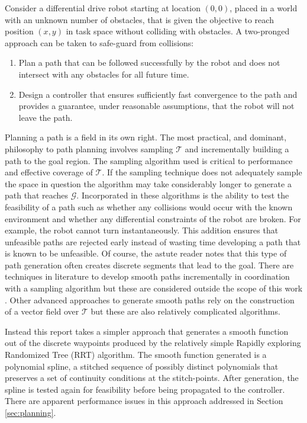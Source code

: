 \documentclass[oneside, 11pt]{book}
\begin{document}
Consider a differential drive robot starting at location $(0,0)$, placed in a world with an unknown number of obstacles, that is given the objective to reach position $(x,y)$ in task space without colliding with obstacles. A two-pronged approach can be taken to safe-guard from collisions:
\begin{enumerate}
    \item Plan a path that can be followed successfully by the robot and does not intersect with any obstacles for all future time.
    \item Design a controller that ensures sufficiently fast convergence to the path and provides a guarantee, under reasonable assumptions, that the robot will not leave the path.
\end{enumerate}

Planning a path is a field in its own right. The most practical, and dominant, philosophy to path planning involves sampling $\mathcal{T}$ and incrementally building a path to the goal region. The sampling algorithm used is critical to performance and effective coverage of $\mathcal{T}$. If the sampling technique does not adequately sample the space in question the algorithm may take considerably longer to generate a path that reaches $\mathcal{G}$. Incorporated in these algorithms is the ability to test the feasibility of a path such as whether any collisions would occur with the known environment and whether any differential constraints of the robot are broken. For example, the robot cannot turn instantaneously. This addition ensures that unfeasible paths are rejected early instead of wasting time developing a path that is known to be unfeasible. Of course, the astute reader notes that this type of path generation often creates discrete segments that lead to the goal. There are techniques in literature to develop smooth paths incrementally in coordination with a sampling algorithm but these are considered outside the scope of this work \cite{Yang14}. Other advanced approaches to generate smooth paths rely on the construction of a vector field over $\mathcal{T}$ \cite{LaValle06} but these are also relatively complicated algorithms.

Instead this report takes a simpler approach that generates a smooth function out of the discrete waypoints produced by the relatively simple Rapidly exploring Randomized Tree (RRT) algorithm. The smooth function generated is a polynomial spline, a stitched sequence of possibly distinct polynomials that preserves a set of continuity conditions at the stitch-points. After generation, the spline is tested again for feasibility before being propagated to the controller. There are apparent performance issues in this approach addressed in Section \ref{sec:planning}.
\end{document}
